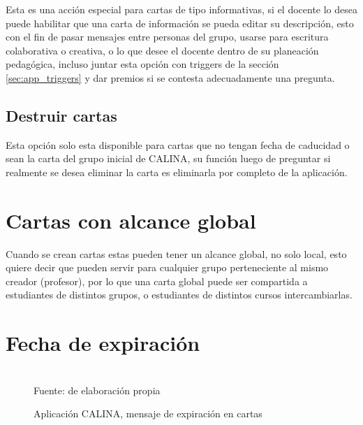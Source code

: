 Esta es una acción especial para cartas de tipo informativas, si el docente lo desea puede habilitar que una 
carta de información se pueda editar su descripción, esto con el fin de pasar mensajes entre personas del 
grupo, usarse para escritura colaborativa o creativa, o lo que desee el docente dentro de su planeación 
pedagógica, incluso juntar esta opción con triggers de la sección \ref{sec:app_triggers} y dar premios si se 
contesta adecuadamente una pregunta.

\subsection{Destruir cartas}

Esta opción solo esta disponible para cartas que no tengan fecha de caducidad o sean la carta del grupo 
inicial de CALINA, su función luego de preguntar si realmente se desea eliminar la carta es eliminarla por 
completo de la aplicación.

\section{Cartas con alcance global}
\label{sec:app_global}

Cuando se crean cartas estas pueden tener un alcance global, no solo local, esto quiere decir que pueden 
servir para cualquier grupo perteneciente al mismo creador (profesor), por lo que una carta global puede ser 
compartida a estudiantes de distintos grupos, o estudiantes de distintos cursos intercambiarlas.

\section{Fecha de expiración}
\label{sec:app_expired}

\begin{figure}[!htb]
\caption[]{Aplicación CALINA, mensaje de expiración en cartas}
\centering
\begin{adjustbox}{width=5cm}
\end{adjustbox}
\\
{\footnotesize Fuente: de elaboración propia}
\end{figure}

